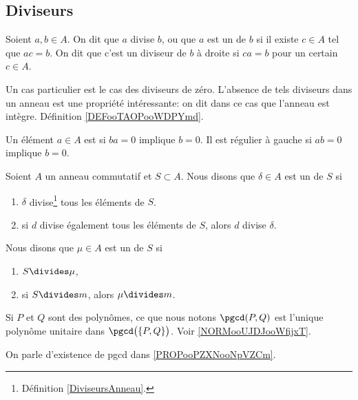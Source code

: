 \subsection{Diviseurs}


\begin{definition}\label{DiviseursAnneau}
	Soient \( a, b \in A \). On dit que \( a\) divise \( b\), ou que \( a\) est un  de \( b\) si il existe \( c \in A \) tel que \( ac = b \). On dit que c'est un diviseur de \( b\) à droite si \( ca = b \) pour un certain \( c \in A \).
\end{definition}
Un cas particulier est le cas des diviseurs de zéro. L'absence de tels diviseurs dans un anneau est une propriété intéressante: on dit dans ce cas que l'anneau est intègre. Définition \ref{DEFooTAOPooWDPYmd}.

Un élément \( a\in A\) est  si \( ba=0\) implique \( b=0\). Il est régulier à gauche si \( ab=0\) implique \( b=0\).

\begin{definition}          \label{DefrYwbct}
	Soient \( A\) un anneau commutatif et \( S\subset A\). Nous disons que \( \delta\in A\) est un  de \( S\) si
	\begin{enumerate}
		\item
		      \( \delta\) divise\footnote{Définition \ref{DiviseursAnneau}.} tous les éléments de \( S\).
		\item       \label{ITEMooVCKGooWDXZOj}
		      si \( d\) divise également tous les éléments de \( S\), alors \( d\) divise \( \delta\).
	\end{enumerate}
	Nous disons que \( \mu\in A\) est un  de \( S\) si
	\begin{enumerate}
		\item
		      \( S\divides \mu\),
		\item
		      si \( S\divides m\), alors \( \mu\divides m\).
	\end{enumerate}
	Si \( P\) et \( Q\) sont des polynômes, ce que nous notons \( \pgcd(P,Q)\) est l'unique polynôme unitaire dans \( \pgcd\big( \{ P,Q \} \big)\). Voir \ref{NORMooUJDJooWfijxT}.
\end{definition}

\begin{normaltext}
	On parle d'existence de pgcd dans \ref{PROPooPZXNooNpVZCm}.
\end{normaltext}

